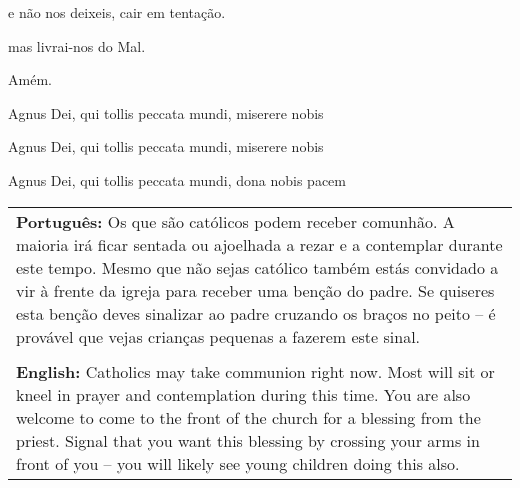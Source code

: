 e não nos deixeis, cair em tentação. 

mas livrai-nos do Mal.

Amém.



Agnus Dei, qui tollis peccata mundi, miserere nobis

Agnus Dei, qui tollis peccata mundi, miserere nobis

Agnus Dei, qui tollis peccata mundi, dona nobis pacem





\begin{tabular}{p{3.5in}}
{\bf Português:} Os que são católicos podem receber comunhão. A maioria irá ficar sentada ou ajoelhada a rezar e a contemplar durante este tempo. Mesmo que não sejas católico também estás convidado a vir à frente da igreja para receber uma benção do padre. Se quiseres esta benção deves sinalizar ao padre cruzando os braços no peito -- é provável que vejas crianças pequenas a fazerem este sinal.\\
\\
{\bf English:} Catholics may take communion right now. Most will sit or kneel in prayer and contemplation during this time. You are also welcome to come to the front of the church for a blessing from the priest. Signal that you want this blessing by crossing your arms in front of you -- you will likely see young children doing this also.\\
\end{tabular}


\newpage


